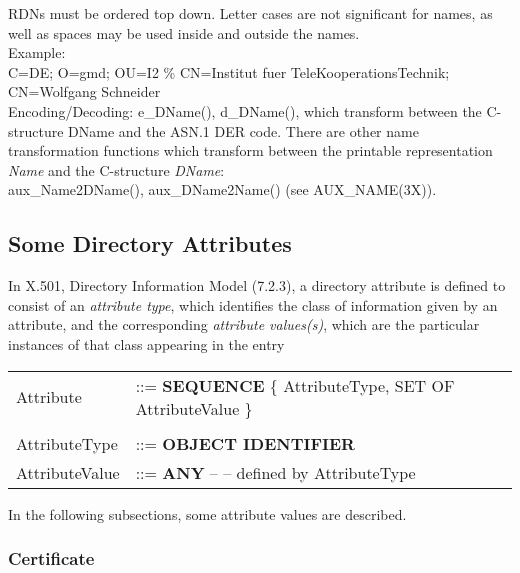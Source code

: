 RDNs must be ordered top down. Letter cases are not significant for names, 
as well as spaces may be used inside and outside the names. \\ [1ex]
Example: \\
{\small
C=DE; O=gmd; OU=I2 \% CN=Institut fuer TeleKooperationsTechnik; CN=Wolfgang Schneider} 
\\ [1em]
Encoding/Decoding: e\_DName(), d\_DName(), 
which transform between the C-structure DName and the ASN.1 DER code.
There are other name transformation functions which transform between
the printable representation {\em Name} and the C-structure {\em DName}: \\
aux\_Name2DName(), aux\_DName2Name() (see AUX\_NAME(3X)). \\ [1ex]

\subsection{Some Directory Attributes}
\label{asn1-x500}

In X.501, Directory Information Model (7.2.3), a directory attribute
is defined to consist of an {\em attribute type},
which identifies the class of information given by an attribute,
and the corresponding {\em attribute values(s)}, which are the
particular instances of that class appearing in the entry

{\small
\begin {center}
\begin {tabular}{lll}
Attribute &
   ::= {\bf SEQUENCE} \{ AttributeType, SET OF AttributeValue \} \\
 & \\
AttributeType  &  ::= {\bf OBJECT IDENTIFIER} \\
AttributeValue &  ::= {\bf ANY} -- -- defined by AttributeType
\end {tabular}
\end {center}
}

In the following subsections, some attribute values are described.

\subsubsection{Certificate}
\label{asn1-cert}

